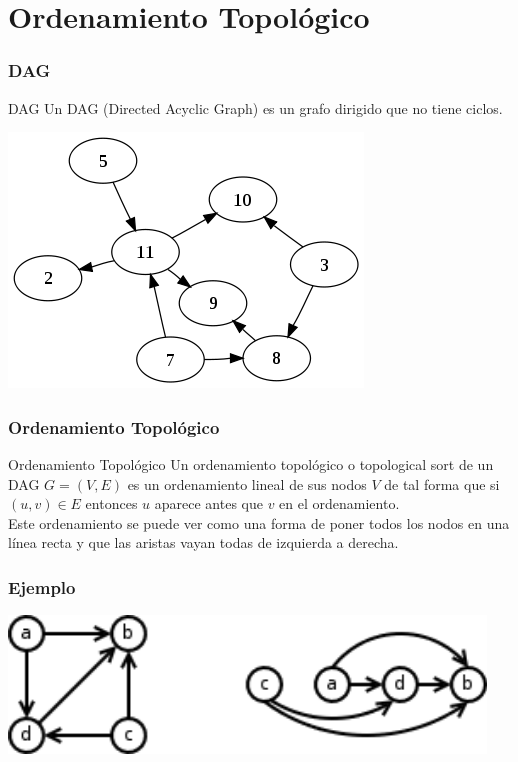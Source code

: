 \documentclass{beamer}
\begin{document}
\section{Ordenamiento Topológico}
	\begin{frame}
		\frametitle{DAG}
		\begin{block}{DAG}
			Un DAG (Directed Acyclic Graph) es un grafo dirigido que no tiene ciclos.
		\end{block}
		\begin{center} \includegraphics[height = 0.4\textheight]{DAG.png} \end{center}
	\end{frame}
	
	\begin{frame}
		\frametitle{Ordenamiento Topológico}
		\begin{block}{Ordenamiento Topológico}
			Un ordenamiento topológico o topological sort de un DAG $G = (V, E)$ es un ordenamiento lineal de sus nodos $V$ de tal forma que si $(u, v) \in E$ entonces $u$ aparece antes que $v$ en el ordenamiento.\\
			Este ordenamiento se puede ver como una forma de poner todos los nodos en una línea recta y que las aristas vayan todas de izquierda a derecha.
		\end{block}
	\end{frame}
	
	\begin{frame}
		\frametitle{Ejemplo}
		\includegraphics[width = 0.95\textwidth]{toposort.png}
	\end{frame}
	
\end{document}
